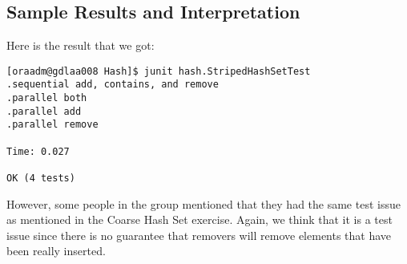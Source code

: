 \subsection{Sample Results and Interpretation}
\par
Here is the result that we got:
\hfill
\begin{verbatim}
[oraadm@gdlaa008 Hash]$ junit hash.StripedHashSetTest
.sequential add, contains, and remove
.parallel both
.parallel add
.parallel remove

Time: 0.027

OK (4 tests)
\end{verbatim}
\hfill
\par
However, some people in the group mentioned that they had the same test issue as
mentioned in the Coarse Hash Set exercise. Again, we think that it is a test
issue since there is no guarantee that removers will remove elements that have
been really inserted.
\par
